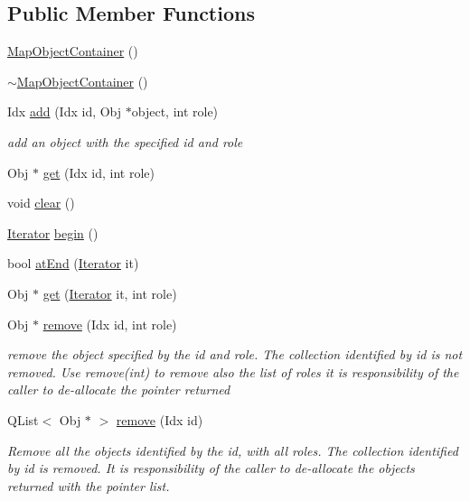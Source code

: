 \subsection*{Public Member Functions}
\begin{DoxyCompactItemize}
\item 
\mbox{\hyperlink{class_map_object_container_ab97ff5f8896b851d2b27e1e991c4d384}{Map\+Object\+Container}} ()
\item 
\mbox{\hyperlink{class_map_object_container_ae7fd84ad97ed9207128e8441795fd4a7}{$\sim$\+Map\+Object\+Container}} ()
\item 
Idx \mbox{\hyperlink{class_map_object_container_ab7e0c9271847d1daaf1d4339075ea183}{add}} (Idx id, Obj $\ast$object, int role)
\begin{DoxyCompactList}\small\item\em add an object with the specified id and role \end{DoxyCompactList}\item 
Obj $\ast$ \mbox{\hyperlink{class_map_object_container_a15a898aa8fe3452a85ad0a82ca5558db}{get}} (Idx id, int role)
\item 
void \mbox{\hyperlink{class_map_object_container_ae620f6d22864720c1a8b8815de46de7f}{clear}} ()
\item 
\mbox{\hyperlink{class_map_object_container_a744f6940937741a8ffd125e146dc86ab}{Iterator}} \mbox{\hyperlink{class_map_object_container_a578d70a39de94f7b8e0edd625eb97ef2}{begin}} ()
\item 
bool \mbox{\hyperlink{class_map_object_container_af908d67a323fdb8540e395dda61e1172}{at\+End}} (\mbox{\hyperlink{class_map_object_container_a744f6940937741a8ffd125e146dc86ab}{Iterator}} it)
\item 
Obj $\ast$ \mbox{\hyperlink{class_map_object_container_a53de9537128d7697e3ee0835f9b52201}{get}} (\mbox{\hyperlink{class_map_object_container_a744f6940937741a8ffd125e146dc86ab}{Iterator}} it, int role)
\item 
Obj $\ast$ \mbox{\hyperlink{class_map_object_container_a679fb7116afc538894fefb7bf3fc87fb}{remove}} (Idx id, int role)
\begin{DoxyCompactList}\small\item\em remove the object specified by the id and role. The collection identified by id is not removed. Use remove(int) to remove also the list of roles it is responsibility of the caller to de-\/allocate the pointer returned \end{DoxyCompactList}\item 
Q\+List$<$ Obj $\ast$ $>$ \mbox{\hyperlink{class_map_object_container_a6b62353d4b08a46f1624b5407c425375}{remove}} (Idx id)
\begin{DoxyCompactList}\small\item\em Remove all the objects identified by the id, with all roles. The collection identified by id is removed. It is responsibility of the caller to de-\/allocate the objects returned with the pointer list. \end{DoxyCompactList}\end{DoxyCompactItemize}


